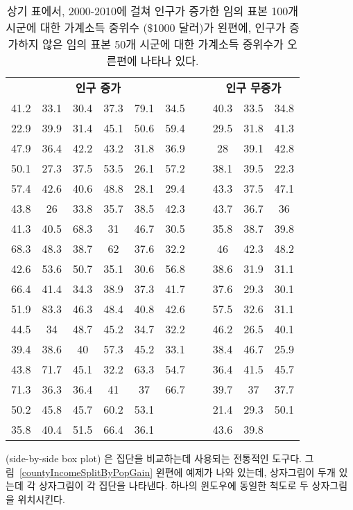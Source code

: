 \begin{table}
\centering
\begin{tabular}{ ccc ccc c ccc }
\multicolumn{6}{c}{\bf 인구 증가} && \multicolumn{3}{c}{\bf 인구 무증가} \\ 
  \cline{1-6} \cline{8-10}
41.2 & 33.1 & 30.4 & 37.3 & 79.1 & 34.5 &\hspace{5mm}\ & 40.3 & 33.5 & 34.8 \\
22.9 & 39.9 & 31.4 & 45.1 & 50.6 & 59.4 && 29.5 & 31.8 & 41.3 \\
47.9 & 36.4 & 42.2 & 43.2 & 31.8 & 36.9 && 28 & 39.1 & 42.8 \\
50.1 & 27.3 & 37.5 & 53.5 & 26.1 & 57.2 && 38.1 & 39.5 & 22.3 \\
57.4 & 42.6 & 40.6 & 48.8 & 28.1 & 29.4 && 43.3 & 37.5 & 47.1 \\
43.8 & 26 & 33.8 & 35.7 & 38.5 & 42.3 && 43.7 & 36.7 & 36 \\
41.3 & 40.5 & 68.3 & 31 & 46.7 & 30.5 && 35.8 & 38.7 & 39.8 \\
68.3 & 48.3 & 38.7 & 62 & 37.6 & 32.2 && 46 & 42.3 & 48.2 \\
42.6 & 53.6 & 50.7 & 35.1 & 30.6 & 56.8 && 38.6 & 31.9 & 31.1 \\
66.4 & 41.4 & 34.3 & 38.9 & 37.3 & 41.7 && 37.6 & 29.3 & 30.1 \\
51.9 & 83.3 & 46.3 & 48.4 & 40.8 & 42.6 && 57.5 & 32.6 & 31.1 \\
44.5 & 34 & 48.7 & 45.2 & 34.7 & 32.2 && 46.2 & 26.5 & 40.1 \\
39.4 & 38.6 & 40 & 57.3 & 45.2 & 33.1 && 38.4 & 46.7 & 25.9 \\
43.8 & 71.7 & 45.1 & 32.2 & 63.3 & 54.7 && 36.4 & 41.5 & 45.7 \\
71.3 & 36.3 & 36.4 & 41 & 37 & 66.7 && 39.7 & 37 & 37.7 \\
50.2 & 45.8 & 45.7 & 60.2 & 53.1 &  && 21.4 & 29.3 & 50.1 \\
35.8 & 40.4 & 51.5 & 66.4 & 36.1 &  && 43.6 & 39.8 &  \\
\cline{1-6} \cline{8-10}
\end{tabular}
\caption{상기 표에서, 2000-2010에 걸쳐 인구가 증가한 임의 표본 100개 시군에 대한 가계소득 중위수 (\$1000 달러)가 왼편에, 
인구가 증가하지 않은 임의 표본 50개 시군에 대한 가계소득 중위수가 오른편에 나타나 있다.}
\label{countyIncomeSplitByPopGainTable}
\end{table}


(side-by-side box plot) 은 집단을 비교하는데 사용되는 전통적인 도구다. 그림~\ref{countyIncomeSplitByPopGain} 왼편에 예제가 나와 있는데, 상자그림이 두개 있는데 각 상자그림이 각 집단을 나타낸다. 하나의 윈도우에 동일한 척도로 두 상자그림을 위치시킨다. 

